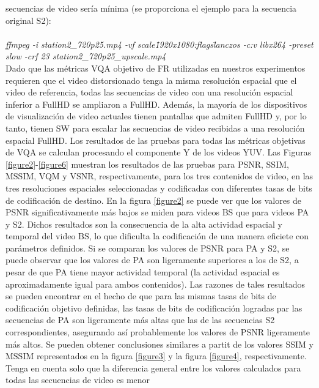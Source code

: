 \documentclass[conference]{IEEEtran}
\begin{document}
    secuencias de video sería mínima \cite{biblio23}(se proporciona el ejemplo 
    para la secuencia original S2):\\
    \\
    \textsl{ffmpeg -i station2\_720p25.mp4 -vf scale\=1920x1080:flags\=lanczos 
    -c:v libx264 -preset slow -crf 23 station2\_720p25\_upscale.mp4}
    \\
    Dado que las métricas VQA objetivo de FR utilizadas en nuestros 
    experimentos requieren que el video distorsionado tenga la misma 
    resolución espacial que el video de referencia, todas las secuencias 
    de video con una resolución espacial inferior a FullHD se ampliaron a 
    FullHD. Además, la mayoría de los dispositivos de visualización de 
    video actuales tienen pantallas que admiten FullHD y, por lo tanto, 
    tienen SW para escalar las secuencias de video recibidas a una 
    resolución espacial FullHD. Los resultados de las pruebas para todas 
    las métricas objetivas de VQA se calculan procesando el componente 
    Y de los videos YUV. Las Figuras \ref{figure2}-\ref{figure6} muestran los resultados de las 
    pruebas para PSNR, SSIM, MSSIM, VQM y VSNR, respectivamente, 
    para los tres contenidos de video, en las tres resoluciones espaciales 
    seleccionadas y codificadas con diferentes tasas de bits de 
    codificación de destino. En la figura \ref{figure2} se puede ver que los valores de 
    PSNR significativamente más bajos se miden para videos BS que para 
    videos PA y S2. Dichos resultados son la consecuencia de la alta 
    actividad espacial y temporal del video BS, lo que dificulta la 
    codificación de una manera eficiete con parámetros definidos. Si se 
    comparan los valores de PSNR para PA y S2, se puede observar que 
    los valores de PA son ligeramente superiores a los de S2, a pesar de 
    que PA tiene mayor actividad temporal (la actividad espacial es 
    aproximadamente igual para ambos contenidos). Las razones de 
    tales resultados se pueden encontrar en el hecho de que para las 
    mismas tasas de bits de codificación objetivo definidas, las tasas de 
    bits de codificación logradas par las secuencias de PA son 
    ligeramente más altas que las de las secuencias S2 correspondientes, 
    asegurando así probablemente los valores de PSNR ligeramente más 
    altos. Se pueden obtener conclusiones similares a partit de los 
    valores SSIM y MSSIM representados en la figura \ref{figure3} y la figura \ref{figure4}, 
    respectivamente. Tenga en cuenta solo que la diferencia general entre 
    los valores calculados para todas las secuencias de video es menor 
\end{document}
